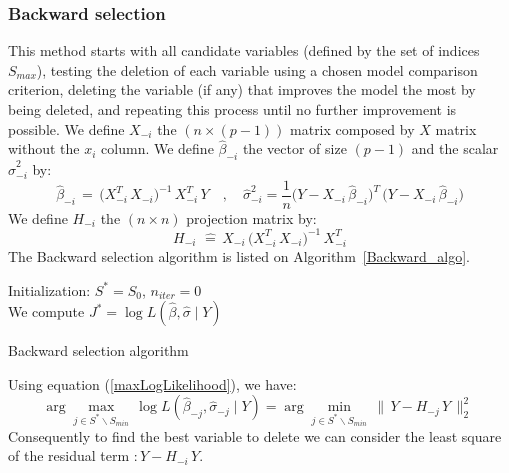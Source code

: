 \subsubsection{Backward selection}
This method starts with all candidate variables
(defined by the set of indices $S_{max}$), testing the deletion of each variable using a chosen model comparison criterion,
 deleting the variable (if any) that improves the model the most by being deleted, and repeating this process until no further improvement is possible.
We define $X_{-i}$ the $(n \times (p-1))$ matrix composed by $X$ matrix without the $x_i$ column.
We define $\hat{\beta}_{-i}$ the vector of size $(p-1)$ and the scalar $\hat{\sigma}_{-i}^2$ by:
 \begin{equation}
  \hat{\beta}_{-i} \,=\, \big(X^T_{-i} \,X_{-i}\big)^{-1} \,X^T_{-i} \, Y
\quad,\quad
\hat{\sigma}_{-i}^2 = \frac{1}{n}\big(Y-X_{-i} \,\hat{\beta}_{-i}\big)^T\,\big(Y-X_{-i} \,\hat{\beta}_{-i}\big)
\end{equation}
We define $H_{-i}$ the $(n\times n)$ projection matrix by:
 \begin{equation}
\label{H-}
H_{-i}\, \,\hat{=}\, X_{-i}\,\big(X^T_{-i} \,X_{-i}\big)^{-1} \,X^T_{-i}
 \end{equation}
The Backward selection algorithm is listed on Algorithm~\ref{Backward_algo}.
\begin{algorithm}
\label{Backward_algo}
Initialization: $S^* = S_0$, $n_{iter} = 0 $\\
We compute $J^* = \log L(\hat{\beta},\hat{\sigma}\mid Y)$  \\
\caption{Backward selection algorithm }
\end{algorithm}

Using equation (\ref{maxLogLikelihood}), we have:
 \begin{equation}
 \arg   \displaystyle\max_{j \in S^*\backslash S_{min}}\,  \log L(\hat{\beta}_{-j},\hat{\sigma}_{-j}\mid Y) =
\arg \displaystyle\min_{j \in S^*\backslash S_{min}}\, \|\,Y-H_{-j}\,Y\,\|^2_2  \,\,
 \end{equation}
Consequently to find the best variable to delete we can consider the least square of the residual term $:Y-H_{-i}\,Y$.

